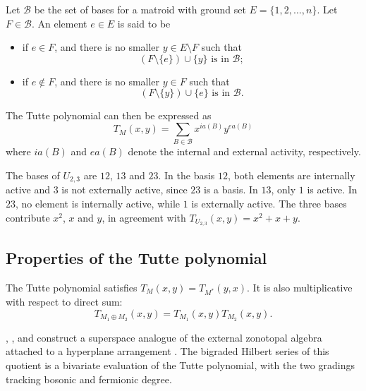 \begin{definition}
Let $\mathcal{B}$ be the set of bases for a matroid with ground set $E=\{1,2,\dotsc,n\}$.
Let $F \in \mathcal{B}$. An element $e\in E$ is said to be
\begin{itemize}
 \item {}\label{internallyActive} if $e \in F$, and there is no smaller $y \in E\setminus F$
 such that
 \[
 (F\setminus \{e\})\cup \{y\} \text{ is in } \mathcal{B};
 \]

 \item {}\label{externallyActive} if $e \notin F$, and there is no smaller $y \in F$
 such that
 \[
 (F\setminus \{y\})\cup \{e\}\text{ is in } \mathcal{B}.
 \]
\end{itemize}
\end{definition}

The Tutte polynomial can then be expressed as
\[
  T_M(x,y) = \sum_{B \in \mathcal{B}} x^{ia(B)} y^{ea(B)}
\]
where $ia(B)$ and $ea(B)$ denote the internal and external activity, respectively.

\begin{example}[Activities in $U_{2,3}$]
The bases of $U_{2,3}$ are $12$, $13$ and $23$.  In the basis $12$, both
elements are internally active and $3$ is not externally active, since
$23$ is a basis.  In $13$, only $1$ is active.  In $23$, no element is
internally active, while $1$ is externally active.  The three bases
contribute $x^2$, $x$ and $y$, in agreement with
$T_{U_{2,3}}(x,y)=x^2+x+y$.
\end{example}


\subsection[tutteProperties]{Properties of the Tutte polynomial}

The Tutte polynomial satisfies $T_{M}(x,y) = T_{M^*}(y,x)$.
It is also multiplicative with respect to direct sum:
\[
T_{M_1 \oplus M_2}(x,y) = T_{M_1}(x,y) T_{M_2}(x,y).
\]

, , and 
construct a superspace analogue of the external zonotopal algebra attached
to a hyperplane arrangement \cite{RhoadesTewariWilson2024x}.  The bigraded
Hilbert series of this quotient is a bivariate evaluation of the Tutte
polynomial, with the two gradings tracking bosonic and fermionic degree.


